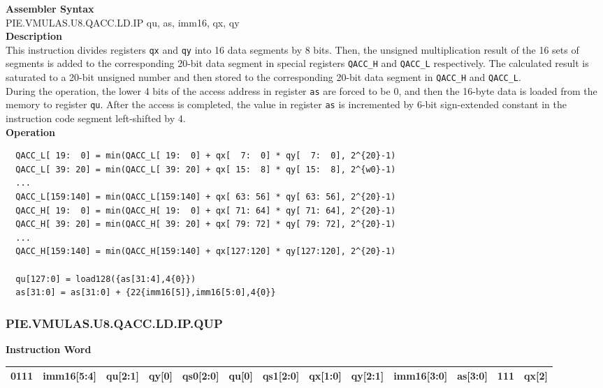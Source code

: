 \textbf{Assembler Syntax} \\
PIE.VMULAS.U8.QACC.LD.IP qu, as, imm16, qx, qy \\
\textbf{Description} \\
This instruction divides registers \lstinline{qx} and \lstinline{qy} into 16 data segments by 8 bits. Then, the unsigned multiplication result of the 16 sets of segments is added to the corresponding 20-bit data segment in special registers \lstinline{QACC_H} and \lstinline{QACC_L} respectively. The calculated result is saturated to a 20-bit unsigned number and then stored to the corresponding 20-bit data segment in \lstinline{QACC_H} and \lstinline{QACC_L}.\\
During the operation, the lower 4 bits of the access address in register \lstinline{as} are forced to be 0, and then the 16-byte data is loaded from the memory to register \lstinline{qu}. After the access is completed, the value in register \lstinline{as} is incremented by 6-bit sign-extended constant in the instruction code segment left-shifted by 4.\\
\textbf{Operation}
\begin{lstlisting}
  QACC_L[ 19:  0] = min(QACC_L[ 19:  0] + qx[  7:  0] * qy[  7:  0], 2^{20}-1)
  QACC_L[ 39: 20] = min(QACC_L[ 39: 20] + qx[ 15:  8] * qy[ 15:  8], 2^{w0}-1)
  ...
  QACC_L[159:140] = min(QACC_L[159:140] + qx[ 63: 56] * qy[ 63: 56], 2^{20}-1)
  QACC_H[ 19:  0] = min(QACC_H[ 19:  0] + qx[ 71: 64] * qy[ 71: 64], 2^{20}-1)
  QACC_H[ 39: 20] = min(QACC_H[ 39: 20] + qx[ 79: 72] * qy[ 79: 72], 2^{20}-1)
  ...
  QACC_H[159:140] = min(QACC_H[159:140] + qx[127:120] * qy[127:120], 2^{20}-1)

  qu[127:0] = load128({as[31:4],4{0}})
  as[31:0] = as[31:0] + {22{imm16[5]},imm16[5:0],4{0}}
\end{lstlisting}

\newpage
\subsubsection{PIE.VMULAS.U8.QACC.LD.IP.QUP}\label{instruction:PIEVMULASU8QACCLDIPQUP}
\setlength\tabcolsep{5pt}
\textbf{Instruction Word} \\
\begin{tabular}{|c|c|c|c|c|c|c|c|c|c|c|c|c|}
	\hline
	0111 & imm16[5:4] & qu[2:1] & qy[0] & qs0[2:0] & qu[0] & qs1[2:0] & qx[1:0] & qy[2:1] & imm16[3:0] & as[3:0] & 111 & qx[2] \\
	\hline
\end{tabular}


